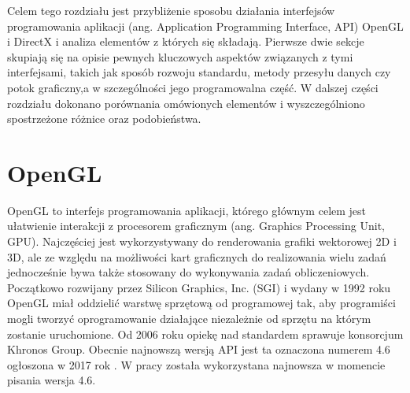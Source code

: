\documentclass[archive]{mgr}
\begin{document}
Celem tego rozdziału jest przybliżenie sposobu działania interfejsów programowania aplikacji (ang. Application Programming Interface, API) OpenGL i DirectX i analiza elementów z których się składają. Pierwsze dwie sekcje skupiają się na opisie pewnych kluczowych aspektów związanych z tymi interfejsami, takich jak sposób rozwoju standardu, metody przesyłu danych czy potok graficzny,a w szczególności jego programowalna część. W dalszej części rozdziału dokonano porównania omówionych elementów i wyszczególniono spostrzeżone różnice oraz podobieństwa.

\section{OpenGL}

OpenGL to interfejs programowania aplikacji, którego głównym celem jest ułatwienie interakcji z procesorem graficznym (ang. Graphics Processing Unit, GPU). Najczęściej jest wykorzystywany do renderowania grafiki wektorowej 2D i 3D, ale ze względu na możliwości kart graficznych do realizowania wielu zadań jednocześnie bywa także stosowany do wykonywania zadań obliczeniowych. Początkowo rozwijany przez Silicon Graphics, Inc. (SGI) i wydany w 1992 roku OpenGL miał oddzielić warstwę sprzętową od programowej tak, aby programiści mogli tworzyć oprogramowanie działające niezależnie od sprzętu na którym zostanie uruchomione. Od 2006 roku opiekę nad standardem sprawuje konsorcjum Khronos Group. Obecnie najnowszą wersją API jest ta oznaczona numerem 4.6 ogłoszona w 2017 rok \cite{OpenGLHistory}. W pracy została wykorzystana najnowsza w momencie pisania wersja  4.6.\\
\end{document}
